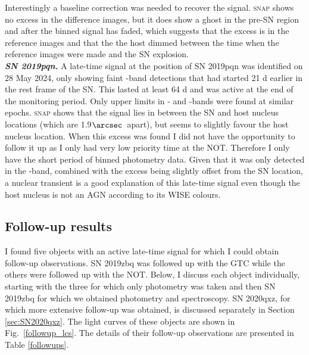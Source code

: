 \documentclass[a4paper,oneside,12pt, class=Latex/Classes/PhDthesisPSnPDF, crop=false]{standalone}
\begin{document}
Interestingly a baseline correction was needed to recover the signal. \textsc{snap} shows no excess in the difference images, but it does show a ghost in the pre-SN region and after the binned signal has faded, which suggests that the excess is in the reference images and that the the host dimmed between the time when the reference images were made and the SN explosion.\\


\textit{\textbf{SN 2019pqn.}}
A late-time signal at the position of SN 2019pqn was identified on 28 May 2024, only showing faint \ztfg-band detections that had started 21 d earlier in the rest frame of the SN. This lasted at least 64 d and was active at the end of the monitoring period. Only upper limits in \ztfr- and \ztfr-bands were found at similar epochs. \textsc{snap} shows that the signal lies in between the SN and host nucleus locations (which are 1.9$\arcsec$\ apart), but seems to slightly favour the host nucleus location. When this excess was found I did not have the opportunity to follow it up as I only had very low priority time at the NOT. Therefore I only have the short period of binned photometry data. Given that it was only detected in the \ztfg-band, combined with the excess being slightly offset from the SN location, a nuclear transient is a good explanation of this late-time signal even though the host nucleus is not an AGN according to its WISE colours.


\subsection{Follow-up results}
\label{followups_section}
I found five objects with an active late-time signal for which I could obtain follow-up observations. SN 2019zbq was followed up with the GTC while the others were followed up with the NOT. Below, I discuss each object individually, starting with the three for which only photometry was taken and then SN 2019zbq for which we obtained photometry and spectroscopy. SN 2020qxz, for which more extensive follow-up was obtained, is discussed separately in Section \ref{sec:SN2020qxz}. The light curves of these objects are shown in Fig.~\ref{followup_lcs}. The details of their follow-up observations are presented in Table \ref{followups}.\\
\end{document}
